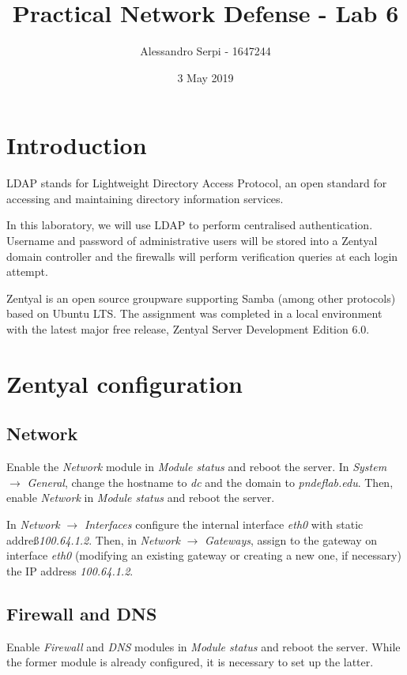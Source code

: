\documentclass[draft]{homework}
\title{Practical Network Defense - Lab 6}
\author{Alessandro Serpi - 1647244}
\date{3 May 2019}
\begin{document}
    \maketitle
    \tableofcontents
    
    
    \pagebreak
    \section{Introduction}
    LDAP stands for Lightweight Directory Access Protocol, an open standard for accessing and maintaining directory information services.
    
    In this laboratory, we will use LDAP to perform centralised authentication.
    Username and password of administrative users will be stored into a Zentyal domain controller and the firewalls will perform verification queries at each login attempt.
    
    Zentyal is an open source groupware supporting Samba (among other protocols) based on Ubuntu LTS.
    The assignment was completed in a local environment with the  latest major free release, Zentyal Server Development Edition 6.0.
    
    
    \section{Zentyal configuration}
    \subsection{Network}
    Enable the \textit{Network} module in \textit{Module status} and reboot the server.
    In \textit{System} $\rightarrow$ \textit{General}, change the hostname to \textit{dc} and the domain to \textit{pndeflab.edu}.
    Then, enable \textit{Network} in \textit{Module status} and reboot the server.
    
    In \textit{Network} $\rightarrow$ \textit{Interfaces} configure the internal interface \textit{eth0} with static addre\ss \textit{100.64.1.2}. 
    Then, in \textit{Network} $\rightarrow$ \textit{Gateways}, assign to the gateway on interface \textit{eth0} (modifying an existing gateway or creating a new one, if necessary) the IP address \textit{100.64.1.2}.
        
    \subsection{Firewall and DNS}
    Enable \textit{Firewall} and \textit{DNS} modules in \textit{Module status} and reboot the server.
    While the former module is already configured, it is necessary to set up the latter.
    
\end{document}
